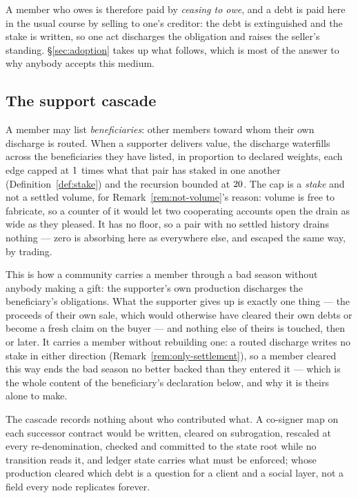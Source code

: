 A member who owes is therefore paid by \emph{ceasing to owe}, and a debt is paid here in
the usual course by selling to one's creditor: the debt is extinguished and the stake is
written, so one act discharges the obligation and raises the seller's standing.
\S\ref{sec:adoption} takes up what follows, which is most of the answer to why anybody
accepts this medium.

\subsection{The support cascade}

A member may list \emph{beneficiaries}: other members toward whom their own discharge is
routed. When a supporter delivers value, the discharge waterfills across the beneficiaries
they have listed, in proportion to declared weights, each edge capped at $1$
times what that pair has staked in one another (Definition~\ref{def:stake}) and the
recursion bounded at $20$. The cap is a \emph{stake} and not a settled
volume, for Remark~\ref{rem:not-volume}'s reason: volume is free to fabricate, so a
counter of it would let two cooperating accounts open the drain as wide as they pleased.
It has no floor, so a pair with no settled history drains nothing --- zero is absorbing
here as everywhere else, and escaped the same way, by trading.

This is how a community carries a member through a bad season without anybody making a
gift: the supporter's own production discharges the beneficiary's obligations. What the
supporter gives up is exactly one thing --- the proceeds of their own sale, which would
otherwise have cleared their own debts or become a fresh claim on the buyer --- and
nothing else of theirs is touched, then or later. It carries a member without rebuilding
one: a routed discharge writes no stake in either direction
(Remark~\ref{rem:only-settlement}), so a member cleared this way ends the bad season no
better backed than they entered it --- which is the whole content of the beneficiary's
declaration below, and why it is theirs alone to make.

The cascade records nothing about who contributed what. A co-signer map on each successor
contract would be written, cleared on subrogation, rescaled at every re-denomination,
checked and committed to the state root while no transition reads it, and ledger state
carries what must be enforced; whose production cleared which debt is a question for a
client and a social layer, not a field every node replicates forever.

